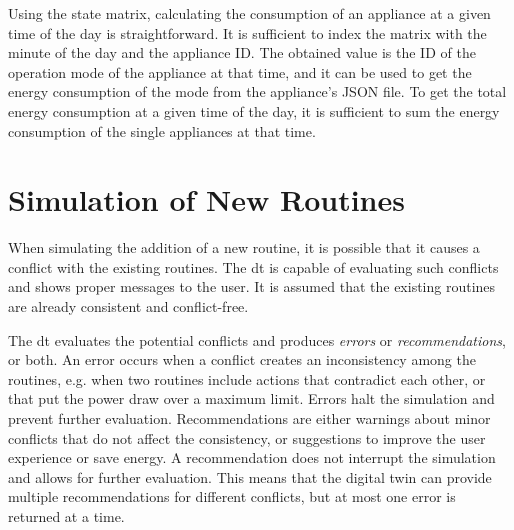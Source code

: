 Using the state matrix, calculating the consumption of an appliance at a given time of the day is straightforward. It is sufficient to index the matrix with the minute of the day and the appliance ID. The obtained value is the ID of the operation mode of the appliance at that time, and it can be used to get the energy consumption of the mode from the appliance's JSON file. To get the total energy consumption at a given time of the day, it is sufficient to sum the energy consumption of the single appliances at that time.

\section{Simulation of New Routines}\label{sec:simulation}

When simulating the addition of a new routine, it is possible that it causes a conflict with the existing routines. The \acrshort{dt} is capable of evaluating such conflicts and shows proper messages to the user. It is assumed that the existing routines are already consistent and conflict-free.

The \acrshort{dt} evaluates the potential conflicts and produces \textit{errors} or \textit{recommendations}, or both. An error occurs when a conflict creates an inconsistency among the routines, e.g. when two routines include actions that contradict each other, or that put the power draw over a maximum limit. Errors halt the simulation and prevent further evaluation. Recommendations are either warnings about minor conflicts that do not affect the consistency, or suggestions to improve the user experience or save energy. A recommendation does not interrupt the simulation and allows for further evaluation. This means that the digital twin can provide multiple recommendations for different conflicts, but at most one error is returned at a time.


